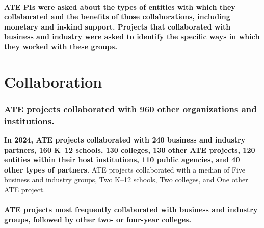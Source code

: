 \documentclass[
]{report}
\begin{document}
\hypertarget{ate-pis-were-asked-about-the-types-of-entities-with-which-they-collaborated-and-the-benefits-of-those-collaborations-including-monetary-and-in-kind-support.-projects-that-collaborated-with-business-and-industry-were-asked-to-identify-the-specific-ways-in-which-they-worked-with-these-groups.}{%
\paragraph{ATE PIs were asked about the types of entities with which they collaborated and the benefits of those collaborations, including monetary and in-kind support. Projects that collaborated with business and industry were asked to identify the specific ways in which they worked with these groups.}\label{ate-pis-were-asked-about-the-types-of-entities-with-which-they-collaborated-and-the-benefits-of-those-collaborations-including-monetary-and-in-kind-support.-projects-that-collaborated-with-business-and-industry-were-asked-to-identify-the-specific-ways-in-which-they-worked-with-these-groups.}}

\hypertarget{collaboration-1}{%
\section{Collaboration}\label{collaboration-1}}

\hypertarget{ate-projects-collaborated-with-960-other-organizations-and-institutions.}{%
\subsubsection{ATE projects collaborated with 960 other organizations and institutions.}\label{ate-projects-collaborated-with-960-other-organizations-and-institutions.}}

\textbf{In 2024, ATE projects collaborated with 240 business and industry partners, 160 K--12 schools, 130 colleges, 130 other ATE projects, 120 entities within their host institutions, 110 public agencies, and 40 other types of partners.} ATE projects collaborated with a median of Five business and industry groups, Two K--12 schools, Two colleges, and One other ATE project.

\hypertarget{ate-projects-most-frequently-collaborated-with-groups-followed-by-.}{%
\paragraph{\texorpdfstring{ATE projects most frequently collaborated with \textcolor{245075}{\textbf{business and industry}} groups, followed by \textcolor{245075}{\textbf{other two- or four-year colleges}}.}{ATE projects most frequently collaborated with  groups, followed by .}}\label{ate-projects-most-frequently-collaborated-with-groups-followed-by-.}}
\end{document}
